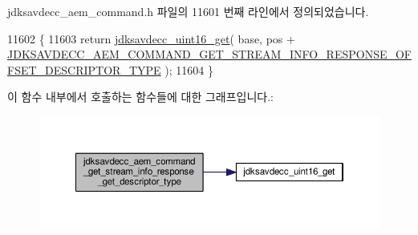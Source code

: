 jdksavdecc\+\_\+aem\+\_\+command.\+h 파일의 11601 번째 라인에서 정의되었습니다.


\begin{DoxyCode}
11602 \{
11603     \textcolor{keywordflow}{return} \hyperlink{group__endian_ga3fbbbc20be954aa61e039872965b0dc9}{jdksavdecc\_uint16\_get}( base, pos + 
      \hyperlink{group__command__get__stream__info__response_gac8e85f7fc918060e917097152be4b3e4}{JDKSAVDECC\_AEM\_COMMAND\_GET\_STREAM\_INFO\_RESPONSE\_OFFSET\_DESCRIPTOR\_TYPE}
       );
11604 \}
\end{DoxyCode}


이 함수 내부에서 호출하는 함수들에 대한 그래프입니다.\+:
\nopagebreak
\begin{figure}[H]
\begin{center}
\leavevmode
\includegraphics[width=350pt]{group__command__get__stream__info__response_ga8a6c2cdf1f47400b5e7802d1a3377f56_cgraph}
\end{center}
\end{figure}




